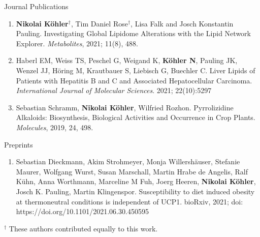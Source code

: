 
\datedsubsection{}
{%
}
{%
	Journal Publications
}
{%
	\begin{enumerate}
		\item \textbf{Nikolai K\"ohler}$^{\dagger}$, Tim Daniel Rose$^{\dagger}$, Lisa Falk and Josch Konstantin Pauling. Investigating Global Lipidome Alterations with the Lipid Network Explorer. \emph{Metabolites}, 2021; 11(8), 488.
		\item Haberl EM, Weiss TS, Peschel G, Weigand K, \textbf{K\"ohler N}, Pauling JK, Wenzel JJ, Höring M, Krautbauer S, Liebisch G, Buechler C. Liver Lipids of Patients with Hepatitis B and C and Associated Hepatocellular Carcinoma. \emph{International Journal of Molecular Sciences}. 2021; 22(10):5297
		\item Sebastian Schramm, \textbf{Nikolai K\"ohler}, Wilfried Rozhon. Pyrrolizidine Alkaloids: Biosynthesis, Biological Activities and Occurrence in Crop Plants. \emph{Molecules}, 2019, 24, 498.
		\setcounter{publicationCounter}{\value{enumi}}	%
	\end{enumerate}
}

\datedsubsection{}
{%
}
{%
	Preprints
}
{%
	\begin{enumerate}
		\item Sebastian Dieckmann, Akim Strohmeyer, Monja Willershäuser, Stefanie Maurer, Wolfgang Wurst, Susan Marschall, Martin Hrabe de Angelis, Ralf Kühn, Anna Worthmann, Marceline M Fuh, Joerg Heeren, \textbf{Nikolai Köhler}, Josch K. Pauling, Martin Klingenspor. Susceptibility to diet induced obesity at thermoneutral conditions is independent of UCP1. bioRxiv, 2021; doi: https://doi.org/10.1101/2021.06.30.450595
		\setcounter{publicationCounter}{\value{enumi}}	%
	\end{enumerate}
}
\bigskip
{\footnotesize $^{\dagger}$ These authors contributed equally to this work.}


